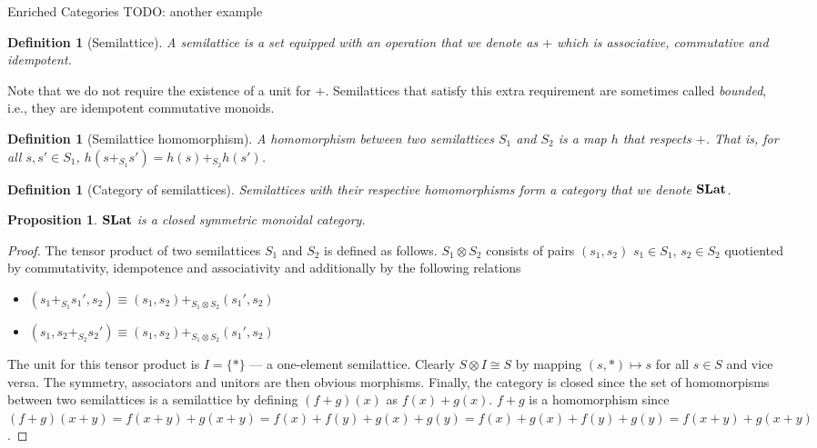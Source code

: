 \documentclass[acmsmall, screen, nonacm]{acmart}
\newtheorem{definition}[theorem]{Definition}
\newtheorem{proposition}[theorem]{Proposition}
\begin{document}
\begin{section}{Enriched Categories}
TODO: another example

\begin{definition}[Semilattice]
  A \textit{semilattice} is a set equipped with an operation that we denote as $+$ which is associative, commutative and idempotent.
\end{definition}

Note that we do not require the existence of a unit for $+$. 
Semilattices that satisfy this extra requirement are sometimes called \textit{bounded}, i.e., they are idempotent commutative monoids.

\begin{definition}[Semilattice homomorphism]

A homomorphism between two semilattices $S_{1}$ and $S_{2}$ is a map $h$ that respects $+$.
That is, for all $s,s' \in S_{1}$, $h(s +_{S_{1}} s') = h(s) +_{S_{2}} h(s')$.
\end{definition}

\begin{definition}[Category of semilattices]
  
Semilattices with their respective homomorphisms form a category that we denote $\mathbf{SLat}$.
\end{definition}

\begin{proposition}
  $\mathbf{SLat}$ is a closed symmetric monoidal category.
\end{proposition}
\begin{proof}
  The tensor product of two semilattices $S_{1}$ and $S_{2}$ is defined as follows.
  $S_{1} \otimes S_{2}$ consists of pairs $(s_1,s_2)$ $s_{1} \in S_{1}$, $s_{2} \in S_{2}$ quotiented by commutativity, idempotence and associativity and additionally by the following relations
  \begin{itemize}
    \item $(s_{1} +_{S_{1}} s_{1}',s_{2}) \equiv (s_{1},s_{2}) +_{S_{1} \otimes S_{2}} (s_{1}',s_{2})$
    \item $(s_{1}, s_{2} +_{S_{2}} s_{2}') \equiv (s_{1},s_{2}) +_{S_{1} \otimes S_{2}} (s_{1}',s_{2})$
  \end{itemize}

  The unit for this tensor product is $I = \{*\}$ --- a one-element semilattice.
  Clearly $S \otimes I \cong S$ by mapping $(s,*) \mapsto s$ for all $s \in S$ and vice versa.
  The symmetry, associators and unitors are then obvious morphisms.
  Finally, the category is closed since the set of homomorpisms between two semilattices is a semilattice by defining $(f + g)(x)$ as $f(x) + g(x)$.
  $f + g$ is a homomorphism since $(f + g)(x+y) = f(x+y) + g(x+y) = f(x) + f(y) + g(x) + g(y) = f(x) + g(x) + f(y) + g(y) = f(x+y) + g(x+y)$.
\end{proof}


\end{section}
\end{document}
